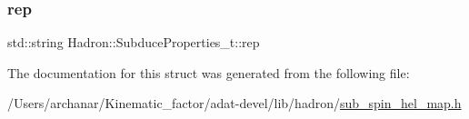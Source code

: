 \mbox{\label{structHadron_1_1SubduceProperties__t_a0983c7ff2504c5d4a32467371090f08d}} 
\subsubsection{\texorpdfstring{rep}{rep}}
{\footnotesize\ttfamily std\+::string Hadron\+::\+Subduce\+Properties\+\_\+t\+::rep}



The documentation for this struct was generated from the following file\+:\begin{DoxyCompactItemize}
\item 
/\+Users/archanar/\+Kinematic\+\_\+factor/adat-\/devel/lib/hadron/\mbox{\hyperlink{adat-devel_2lib_2hadron_2sub__spin__hel__map_8h}{sub\+\_\+spin\+\_\+hel\+\_\+map.\+h}}\end{DoxyCompactItemize}
